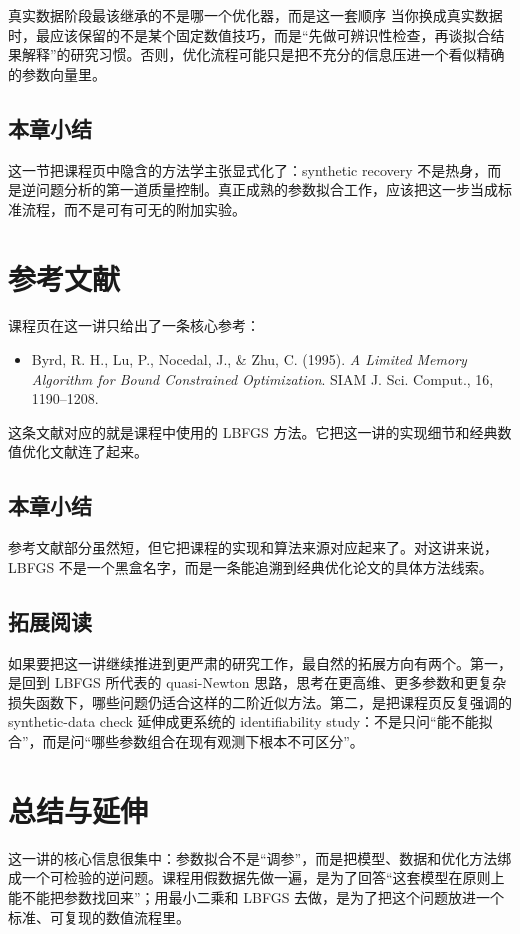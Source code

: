 \documentclass[a4paper]{article}
\begin{document}
\begin{importantbox}{真实数据阶段最该继承的不是哪一个优化器，而是这一套顺序}
当你换成真实数据时，最应该保留的不是某个固定数值技巧，而是“先做可辨识性检查，再谈拟合结果解释”的研究习惯。否则，优化流程可能只是把不充分的信息压进一个看似精确的参数向量里。
\end{importantbox}

\subsection{本章小结}
这一节把课程页中隐含的方法学主张显式化了：synthetic recovery 不是热身，而是逆问题分析的第一道质量控制。真正成熟的参数拟合工作，应该把这一步当成标准流程，而不是可有可无的附加实验。

\section{参考文献}
课程页在这一讲只给出了一条核心参考：

\begin{itemize}
    \item Byrd, R. H., Lu, P., Nocedal, J., \& Zhu, C. (1995). \emph{A Limited Memory Algorithm for Bound Constrained Optimization}. SIAM J. Sci. Comput., 16, 1190--1208.
\end{itemize}

这条文献对应的就是课程中使用的 LBFGS 方法。它把这一讲的实现细节和经典数值优化文献连了起来。

\subsection{本章小结}
参考文献部分虽然短，但它把课程的实现和算法来源对应起来了。对这讲来说，LBFGS 不是一个黑盒名字，而是一条能追溯到经典优化论文的具体方法线索。

\subsection{拓展阅读}
如果要把这一讲继续推进到更严肃的研究工作，最自然的拓展方向有两个。第一，是回到 LBFGS 所代表的 quasi-Newton 思路，思考在更高维、更多参数和更复杂损失函数下，哪些问题仍适合这样的二阶近似方法。第二，是把课程页反复强调的 synthetic-data check 延伸成更系统的 identifiability study：不是只问“能不能拟合”，而是问“哪些参数组合在现有观测下根本不可区分”。

\section{总结与延伸}
这一讲的核心信息很集中：参数拟合不是“调参”，而是把模型、数据和优化方法绑成一个可检验的逆问题。课程用假数据先做一遍，是为了回答“这套模型在原则上能不能把参数找回来”；用最小二乘和 LBFGS 去做，是为了把这个问题放进一个标准、可复现的数值流程里。
\end{document}
